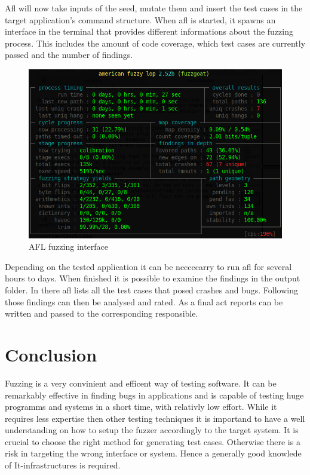 \documentclass[journal=tosc,final]{iacrtrans}
\begin{document}
Afl will now take inputs of the seed, mutate them and insert the test cases in the target application’s command structure.
When afl is started, it spawns an interface in the terminal that provides different informations about the fuzzing process. This includes the amount of code coverage, which test cases are currently passed and the number of findings. 
\begin{figure}[h]
 \caption{AFL fuzzing interface}
 \begin{center}
   \includegraphics[scale=0.35]{afl.png}

 \end{center}
\end{figure}
\newpage
Depending on the tested application it can be neccecarry to run afl for several hours to days. When finished it is possible to examine the findings in the output folder. In there afl lists all the test cases that posed crashes and bugs. Following those findings can then be analysed and rated. As a final act reports can be written and passed to the corresponding responsible.


\section{Conclusion}
Fuzzing is a very convinient and efficent way of testing software. It can be remarkably effective in finding bugs in applications and is capable of testing huge programms and systems in a short time, with relativly low effort. While it requires less expertise then other testing techniques it is importand to have a well understanding on how to setup the fuzzer accordingly to the target system. It is crucial to choose the right method for generating test cases. Otherwise there is a risk in targeting the wrong interface or system. Hence a generally good knowlede of It-infrastructures is required.
\end{document}
